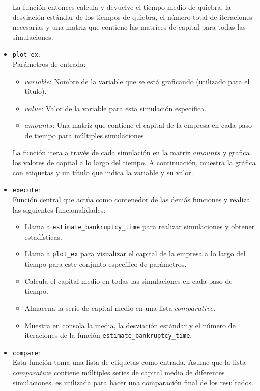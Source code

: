 \documentclass{article}
\begin{document}
\begin{itemize}
    La función entonces calcula y devuelve el tiempo medio de quiebra, la desviación estándar de los tiempos de quiebra, el número total de iteraciones necesarias y una matriz que contiene las matrices de capital para todas las simulaciones.

    \item \texttt{plot\_ex}: \\ 
         Parámetros de entrada:
         \begin{itemize}
            \item $variable$: Nombre de la variable que se está graficando (utilizado para el título).
            \item $value$: Valor de la variable para esta simulación específica.
            \item $amounts$: Una matriz que contiene el capital de la empresa en cada paso de tiempo para múltiples simulaciones.
         \end{itemize}
         La función itera a través de cada simulación en la matriz $amounts$ y grafica los valores de capital a lo largo del tiempo. A continuación, muestra la gráfica con etiquetas y un título que indica la variable y su valor.

    \item \texttt{execute}: \\
           Función central que actúa como contenedor de las demás funciones y realiza las siguientes funcionalidades: 
           \begin{itemize}
            \item Llama a \texttt{estimate\_bankruptcy\_time} para realizar simulaciones y obtener estadísticas.
            \item Llama a \texttt{plot\_ex} para visualizar el capital de la empresa a lo largo del tiempo para este conjunto específico de parámetros.
            \item Calcula el capital medio en todas las simulaciones en cada paso de tiempo.
            \item Almacena la serie de capital medio en una lista $comparative$.
            \item Muestra en consola la media, la desviación estándar y el número de iteraciones de la función \texttt{estimate\_bankruptcy\_time}.
           \end{itemize}
    \item \texttt{compare}: \\
    Esta función toma una lista de etiquetas como entrada. Asume que la lista $comparative$ contiene múltiples series de capital medio de diferentes simulaciones. es utilizada para hacer una comparación final de los resultados. 
 \end{itemize}
\end{document}
